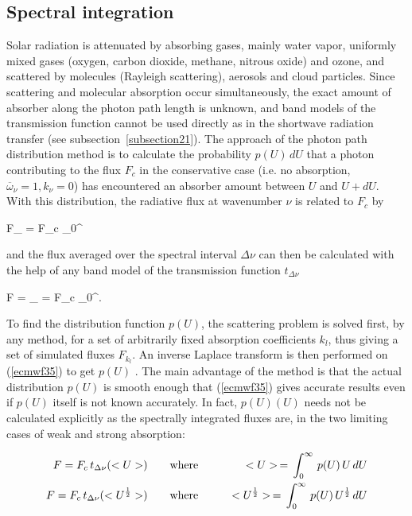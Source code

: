 %
\subsection{Spectral integration}
%

Solar radiation is attenuated by absorbing gases, mainly water vapor,
uniformly mixed gases (oxygen, carbon dioxide, methane, nitrous oxide) and
ozone, and scattered by molecules (Rayleigh scattering), aerosols and cloud 
particles. Since scattering and molecular absorption occur simultaneously, the
exact amount of absorber along the photon path length is unknown, and band
models of the transmission function cannot be used directly as in the shortwave
radiation transfer (see subsection~\ref{subsection21}). The approach of the photon path
distribution method is to calculate the probability $p(U) \, dU$ that a photon
contributing to the flux $F_c$ in the conservative case (i.e. no
absorption, $\overline{\omega}_{\nu} = 1, k_{\nu} = 0$) has encountered an
absorber amount between $U$ and $U + dU$. With this distribution, the radiative flux at wavenumber $\nu $ is related to $F_c$ by

\medskip
\be
F_{\nu} = F_c \int_0^{\infty}
\label{ecmwf35}
\ee
\medskip

\noindent and the flux averaged over the spectral interval $\Delta\nu$ can then be calculated with the help of any band model of the transmission function $t_{\Delta\nu}$

\medskip
\be
F =  \int_{\Delta\nu} = F_c \int_0^{\infty}.
\label{ecmwf36}
\ee
\medskip

To find the distribution function $p(U)$, the scattering problem is solved first, by any method, for a set of arbitrarily fixed absorption coefficients $k_l$, thus giving a set of simulated fluxes $F_{k_l}$. An inverse Laplace transform is then performed on (\ref{ecmwf35}) to get $p(U)$ \citep{Fouquart1974}. The main advantage of the method is that the actual distribution $p(U)$ is smooth enough that (\ref{ecmwf35}) gives accurate results even if $p(U)$ itself is not known accurately. In fact, $p(U)(U)$ needs not be calculated explicitly as the spectrally integrated fluxes are, in the two limiting cases of weak and strong absorption:

\medskip
\begin{eqnarray}\label{ecmwf37}
F = F_c \, t_{\Delta\nu}(<U>)   \qquad &{\rm where}& \qquad <U> \, = \, \int_0^{\infty} \, p(U) \, U \, dU \cr
F = F_c \, t_{\Delta\nu}(<U^{\frac{1}{2}}>) \qquad &{\rm where}& \qquad <U^{\frac{1}{2}}> \, = \, \int_0^{\infty} \, p(U) \, U^{\frac{1}{2}} \, dU
\end{eqnarray}
\medskip

